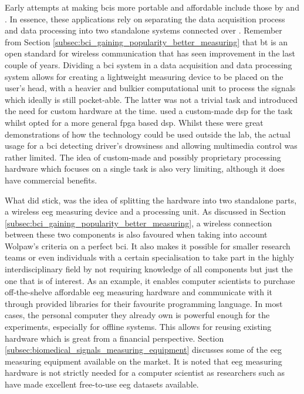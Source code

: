 Early attempts at making \glspl{bci} more portable and affordable include those by \citet{early_bci_drowsiness} and \citet{early_bci_multimedia}.
In essence, these applications rely on separating the data acquisition process and data processing into two standalone systems connected over .
Remember from Section \ref{subsec:bci_gaining_popularity_better_measuring} that \gls{bt} is an open standard for wireless communication that has seen improvement in the last couple of years.
Dividing a \gls{bci} system in a data acquisition and data processing system allows for creating a lightweight measuring device to be placed on the user's head, with a heavier and bulkier computational unit to process the signals which ideally is still pocket-able.
The latter was not a trivial task and introduced the need for custom hardware at the time.
\citet{early_bci_drowsiness} used a custom-made \gls{dsp} for the task whilst \citet{early_bci_multimedia} opted for a more general \gls{fpga} based \gls{dsp}.
Whilst these were great demonstrations of how the technology could be used outside the lab, the actual usage for a bci detecting driver's drowsiness \citep[as proposed in the paper by][]{early_bci_drowsiness} and allowing multimedia control \citep[as proposed in the paper by][]{early_bci_multimedia} was rather limited.
The idea of custom-made and possibly proprietary processing hardware which focuses on a single task is also very limiting, although it does have commercial benefits.

What did stick, was the idea of splitting the hardware into two standalone parts, a wireless \gls{eeg} measuring device and a processing unit.
As discussed in Section \ref{subsec:bci_gaining_popularity_better_measuring}, a wireless connection between these two components is also favoured when taking into account Wolpaw's criteria on a perfect \gls{bci}.
It also makes it possible for smaller research teams or even individuals with a certain specialisation to take part in the highly interdisciplinary field by not requiring knowledge of all components but just the one that is of interest.
As an example, it enables computer scientists to purchase off-the-shelve affordable \gls{eeg} measuring hardware and communicate with it through provided libraries for their favourite programming language.
In most cases, the personal computer they already own is powerful enough for the experiments, especially for offline systems.
This allows for reusing existing hardware which is great from a financial perspective.
Section \ref{subsec:biomedical_signals_measuring_equipment} discusses some of the \gls{eeg} measuring equipment available on the market.
It is noted that \gls{eeg} measuring hardware is not strictly needed for a computer scientist as researchers such as \citet{eeg_data} have made excellent free-to-use \gls{eeg} datasets available.

